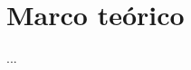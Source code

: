 \documentclass[../main.tex]{subfiles}
\begin{document}
\thispagestyle{fancy}

\section{Marco teórico}%

\thispagestyle{fancy}
...
\newpage
\end{document}
